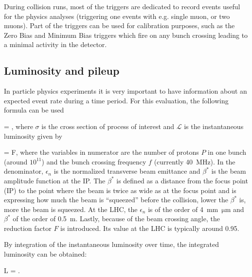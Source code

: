 
During collision runs, most of the triggers are dedicated to record events useful for the physics analyses (triggering one events with e.g. single muon, \MET or two muons). Part of the triggers can be used for calibration purposes, such as the Zero Bias and Minimum Bias triggers which fire on any bunch crossing leading to a minimal activity in the detector.

\subsection{Luminosity and pileup}

In particle physics experiments it is very important to have information about an expected event rate during a time period. For this evaluation, the following formula can be used

{
  = \sigma \times {},
}
where $\sigma$ is the cross section of process of interest and $\mathcal{L}$ is the instantaneous luminosity given by

{
  = F,
}
where the variables in numerator are the number of protons $P$ in one bunch (around $10^{11}$) and the bunch crossing frequency $f$ (currently 40~MHz). In the denominator, $\epsilon_{n}$ is the normalized transverse beam emittance and $\beta^{*}$ is the beam amplitude function at the IP. The $\beta^{*}$ is defined as a distance from the focus point (IP) to the point where the beam is twice as wide as at the focus point and is expressing how much the beam is ``squeezed'' before the collision, lower the $\beta^{*}$ is, more  the beam is squeezed. At the LHC, the  $\epsilon_{n}$ is of the order of 4~mm~$\mathrm{\mu m}$ and $\beta^{*}$ of the order of 0.5~m. Lastly, because of the beam crossing angle, the reduction factor $F$ is introduced. Its value at the LHC is typically around 0.95.

By integration of the instantaneous luminosity over time, the integrated luminosity can be obtained:

{
 L = .
}

